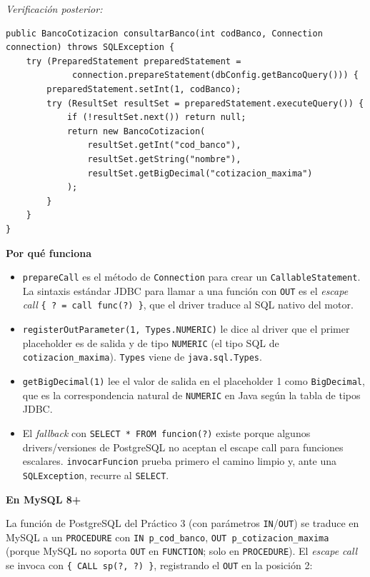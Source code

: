 \documentclass[11pt,a4paper]{article}
\newcommand{\itemcabecera}[1]{\noindent\textbf{#1}\par\medskip}
\newcommand{\bloquePorque}{\itemcabecera{Por qu\'e funciona}}
\newcommand{\bloqueMySQL}{\itemcabecera{En MySQL 8+}}
\begin{document}
\textit{Verificación posterior:}

\begin{lstlisting}
public BancoCotizacion consultarBanco(int codBanco, Connection connection) throws SQLException {
    try (PreparedStatement preparedStatement =
             connection.prepareStatement(dbConfig.getBancoQuery())) {
        preparedStatement.setInt(1, codBanco);
        try (ResultSet resultSet = preparedStatement.executeQuery()) {
            if (!resultSet.next()) return null;
            return new BancoCotizacion(
                resultSet.getInt("cod_banco"),
                resultSet.getString("nombre"),
                resultSet.getBigDecimal("cotizacion_maxima")
            );
        }
    }
}
\end{lstlisting}

\bloquePorque

\begin{itemize}
    \item \texttt{prepareCall} es el método de \texttt{Connection} para crear un \texttt{CallableStatement}. La sintaxis estándar JDBC para llamar a una función con \texttt{OUT} es el \emph{escape call} \texttt{\{ ? = call func(?) \}}, que el driver traduce al SQL nativo del motor.
    \item \texttt{registerOutParameter(1, Types.NUMERIC)} le dice al driver que el primer placeholder es de salida y de tipo \texttt{NUMERIC} (el tipo SQL de \texttt{cotizacion\_maxima}). \texttt{Types} viene de \texttt{java.sql.Types}.
    \item \texttt{getBigDecimal(1)} lee el valor de salida en el placeholder 1 como \texttt{BigDecimal}, que es la correspondencia natural de \texttt{NUMERIC} en Java según la tabla de tipos JDBC.
    \item El \emph{fallback} con \texttt{SELECT * FROM funcion(?)} existe porque algunos drivers/versiones de PostgreSQL no aceptan el escape call para funciones escalares. \texttt{invocarFuncion} prueba primero el camino limpio y, ante una \texttt{SQLException}, recurre al \texttt{SELECT}.
\end{itemize}

\bloqueMySQL

La función de PostgreSQL del Práctico 3 (con parámetros \texttt{IN}/\texttt{OUT}) se traduce en MySQL a un \texttt{PROCEDURE} con \texttt{IN p\_cod\_banco}, \texttt{OUT p\_cotizacion\_maxima} (porque MySQL no soporta \texttt{OUT} en \texttt{FUNCTION}; solo en \texttt{PROCEDURE}). El \emph{escape call} se invoca con \texttt{\{ CALL sp(?, ?) \}}, registrando el \texttt{OUT} en la posición 2:
\end{document}
